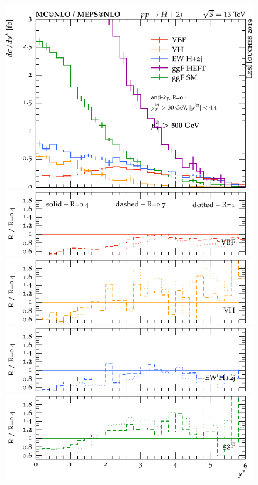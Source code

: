 \documentclass[10pt,prd,fleqn,superscriptaddress,notitlepage,nofootinbib,preprintnumbers,nobalancelastpage]{revtex4-1}
\begin{document}
\begin{figure}[p]
\begin{minipage}{.2925\textwidth}
  \end{minipage}\hfill
  \begin{minipage}{.2925\textwidth}
    \includegraphics[width=\textwidth]{figures/channels/y_star_pth500.pdf}
    \includegraphics[width=\textwidth]{figures/channels/y_star_pth500_rVBF.pdf}
    \includegraphics[width=\textwidth]{figures/channels/y_star_pth500_rVH.pdf}
    \includegraphics[width=\textwidth]{figures/channels/y_star_pth500_rHJJ.pdf}
    \includegraphics[width=\textwidth]{figures/channels/y_star_pth500_rGGH.pdf}

\end{minipage}
\end{figure}
\end{document}
